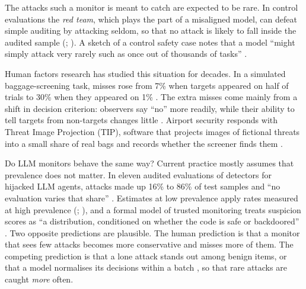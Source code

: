 \documentclass[letterpaper]{article} %
\begin{document}
The attacks such a monitor is meant to catch are expected to be rare. In control evaluations the \emph{red team}, which plays the part of a misaligned model, can defeat simple auditing by attacking seldom, so that no attack is likely to fall inside the audited sample (\citealp[Sec.~3.1]{greenblatt2024}; \citealp[Sec.~3.1]{bhatt2025}). A sketch of a control safety case notes that a model ``might simply attack very rarely such as once out of thousands of tasks'' \citep[Sec.~6]{korbak2025}.

Human factors research has studied this situation for decades. In a simulated baggage-screening task, misses rose from 7\% when targets appeared on half of trials to 30\% when they appeared on 1\% \citep{wolfe2005}. The extra misses come mainly from a shift in decision criterion: observers say ``no'' more readily, while their ability to tell targets from non-targets changes little \citep{wolfe2007}. Airport security responds with Threat Image Projection (TIP), software that projects images of fictional threats into a small share of real bags and records whether the screener finds them \citep{cutler2009,buser2025}.

Do LLM monitors behave the same way? Current practice mostly assumes that prevalence does not matter. In eleven audited evaluations of detectors for hijacked LLM agents, attacks made up 16\% to 86\% of test samples and ``no evaluation varies that share'' \citep[Abstract]{abbasi2026}. Estimates at low prevalence apply rates measured at high prevalence (\citealp[Sec.~6.3]{srivastav2026}; \citealp[Sec.~III.E]{abbasi2026}), and a formal model of trusted monitoring treats suspicion scores as ``a distribution, conditioned on whether the code is safe or backdoored'' \citep[Sec.~2]{griffin2024}. Two opposite predictions are plausible. The human prediction is that a monitor that sees few attacks becomes more conservative and misses more of them. The competing prediction is that a lone attack stands out among benign items, or that a model normalises its decisions within a batch \citep{hida2026}, so that rare attacks are caught \emph{more} often.
\end{document}
